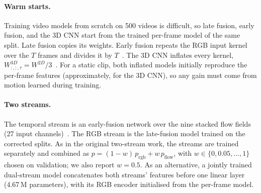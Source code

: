 \paragraph{Warm starts.}
Training video models from scratch on 500 videos is difficult, so late
fusion, early fusion, and the 3D CNN start from the trained per-frame
model of the same split. Late fusion copies its weights. Early fusion
repeats the RGB input kernel over the $T$ frames and divides it by
$T$~\cite{wang2016tsn}. The 3D CNN inflates every kernel,
$W^{3D}_{:,:,\tau}=W^{2D}/3$~\cite{carreira2017i3d}. For a static clip,
both inflated models initially reproduce the per-frame features (approximately, for the 3D
CNN), so any
gain must come from motion learned during training.

\paragraph{Two streams.}
The temporal stream is an early-fusion network over the nine stacked flow
fields (27 input channels)~\cite{simonyan2014twostream}. The RGB stream is
the late-fusion model trained on the corrected splits. As in the original
two-stream work, the streams are trained separately and combined as
$p=(1-w)\,p_\mathrm{rgb}+w\,p_\mathrm{flow}$, with $w\in\{0,0.05,\dots,1\}$
chosen on validation; we also report $w=0.5$. As an alternative, a jointly
trained dual-stream model concatenates both streams' features before one
linear layer (4.67\,M parameters), with its RGB encoder initialised from
the per-frame model.
